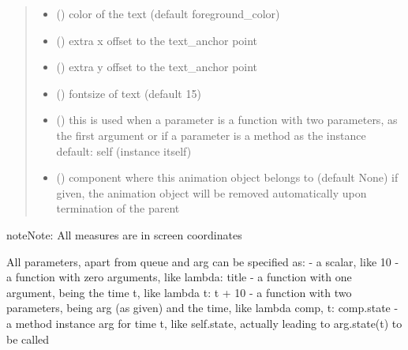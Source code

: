 \documentclass[letterpaper,10pt,english]{sphinxmanual}
\begin{document}
\begin{fulllineitems}
\begin{quote}
\begin{description}
\begin{itemize}
\item {} 
 () \textendash{} color of the text (default foreground\_color)

\item {} 
 () \textendash{} extra x offset to the text\_anchor point

\item {} 
 () \textendash{} extra y offset to the text\_anchor point

\item {} 
 () \textendash{} fontsize of text (default 15)

\item {} 
 () \textendash{} this is used when a parameter is a function with two parameters, as the first argument or
if a parameter is a method as the instance 
default: self (instance itself)

\item {} 
 ({\hyperref[\detokenize{Reference:salabim.Component}]{}}) \textendash{} component where this animation object belongs to (default None) 
if given, the animation object will be removed
automatically upon termination of the parent

\end{itemize}

\end{description}\end{quote}

\begin{sphinxadmonition}{note}{Note:}
All measures are in screen coordinates 

All parameters, apart from queue and arg can be specified as: 
- a scalar, like 10 
- a function with zero arguments, like lambda: title 
- a function with one argument, being the time t, like lambda t: t + 10 
- a function with two parameters, being arg (as given) and the time, like lambda comp, t: comp.state 
- a method instance arg for time t, like self.state, actually leading to arg.state(t) to be called
\end{sphinxadmonition}

\end{fulllineitems}
\end{document}
